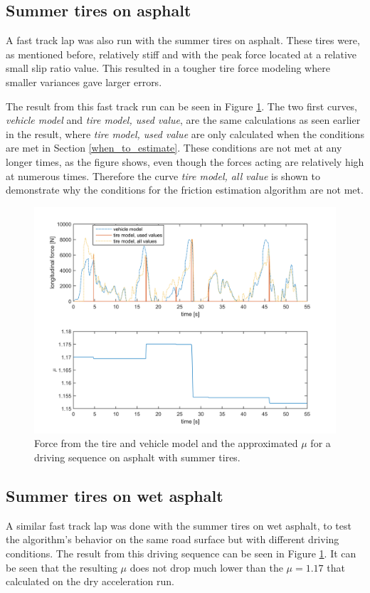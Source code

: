 \subsection{Summer tires on asphalt}
A fast track lap was also run with the summer tires on asphalt. These tires were, as mentioned before, relatively stiff and with the peak force located at a relative small slip ratio value. This resulted in a tougher tire force modeling where smaller variances gave larger errors. 

The result from this fast track run can be seen in Figure \ref{force_mue_race_bb}. The two first curves, \textit{vehicle model} and \textit{tire model, used value}, are the same calculations as seen earlier in the result, where \textit{tire model, used value} are only calculated when the conditions are met in Section \ref{when_to_estimate}. These conditions are not met at any longer times, as the figure shows, even though the forces acting are relatively high at numerous times. Therefore the curve  \textit{tire model, all value} is shown to demonstrate why the conditions for the friction estimation algorithm are not met.

\begin{figure}[h]
	\centering
	\includegraphics[width=1.0\textwidth]{Pictures/force_mue_race_bb}
	\caption {Force from the tire and vehicle model and the approximated $ \mu $ for a driving sequence on asphalt with summer tires.}
	\label{force_mue_race_bb}
\end{figure}

\subsection{Summer tires on wet asphalt}
A similar fast track lap was done with the summer tires on wet asphalt, to test the algorithm's behavior on the same road surface but with different driving conditions. The result from this driving sequence can be seen in Figure \ref{force_mue_race_bb}. It can be seen that the resulting $ \mu $ does not drop much lower than the $ \mu = 1.17 $ that calculated on the dry acceleration run. 

